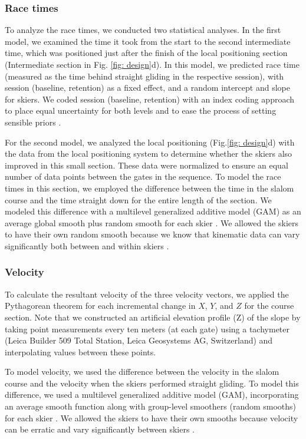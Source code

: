 \documentclass{article}
\begin{document}
\subsubsection{Race times}
To analyze the race times, we conducted two statistical analyses. In the first model, we examined the time it took from the start to the second intermediate time, which was positioned just after the finish of the local positioning section (Intermediate section in Fig. \ref{fig: design}d). In this model, we predicted race time (measured as the time behind straight gliding in the respective session), with session (baseline, retention) as a fixed effect, and a random intercept and slope for skiers. We coded session (baseline, retention) with an index coding approach to place equal uncertainty for both levels and to ease the process of setting sensible priors \cite{mcelreath_statistical_2018}.

For the second model, we analyzed the local positioning (Fig.\ref{fig: design}d) with the data from the local positioning system to determine whether the skiers also improved in this small section. These data were normalized to ensure an equal number of data points between the gates in the sequence. To model the race times in this section, we employed the difference between the time in the slalom course and the time straight down for the entire length of the section. We modeled this difference with a multilevel generalized additive model (GAM) as an average global smooth plus random smooth for each skier \cite{pedersen_hierarchical_2019}. We allowed the skiers to have their own random smooth because we know that kinematic data can vary significantly both between and within skiers \cite{federolf_quantifying_2012, supej_impact_2015, reid_kinematic_2010}.

\subsubsection{Velocity}
To calculate the resultant velocity of the three velocity vectors, we applied the Pythagorean theorem for each incremental change in $X$, $Y$, and $Z$ for the course section. Note that we constructed an artificial elevation profile (Z) of the slope by taking point measurements every ten meters (at each gate) using a tachymeter (Leica Builder 509 Total Station, Leica Geosystems AG, Switzerland) and interpolating values between these points. 

To model velocity, we used the difference between the velocity in the slalom course and the velocity when the skiers performed straight gliding. To model this difference, we used a multilevel generalized additive model (GAM), incorporating an average smooth function along with group-level smoothers (random smooths) for each skier \cite{pedersen_hierarchical_2019}. We allowed the skiers to have their own smooths because velocity can be erratic and vary significantly between skiers \cite{federolf_quantifying_2012, supej_impact_2015, reid_kinematic_2010}. 
\end{document}
